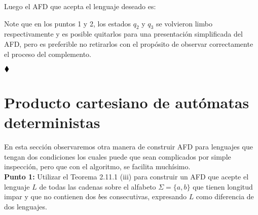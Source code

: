 \begin{basedtikz}
\centering
\end{basedtikz}
Luego el AFD que acepta el lenguaje deseado es:
\begin{basedtikz}
\centering
\end{basedtikz}

Note que en los puntos 1 y 2, los estados $q_2$ y $q_3$ se volvieron limbo respectivamente y es posible quitarlos para una presentación simplificada del AFD, pero es preferible no retirarlos con el propósito de observar correctamente el proceso del complemento.

$\hfill \blacklozenge$ 

\section{Producto cartesiano de autómatas deterministas}

En esta sección observaremos otra manera de construir AFD para lenguajes que tengan dos condiciones los cuales puede que sean complicados por simple inspección, pero que con el algoritmo, se facilita muchísimo.\\

\textbf{Punto 1: }Utilizar el Teorema 2.11.1 (iii) para construir un AFD que acepte el lenguaje $L$ de todas las cadenas sobre el alfabeto $\Sigma=\{a,b\}$ que tienen longitud impar y que no contienen dos $b$es consecutivas, expresando $L$ como diferencia de dos lenguajes.\\

